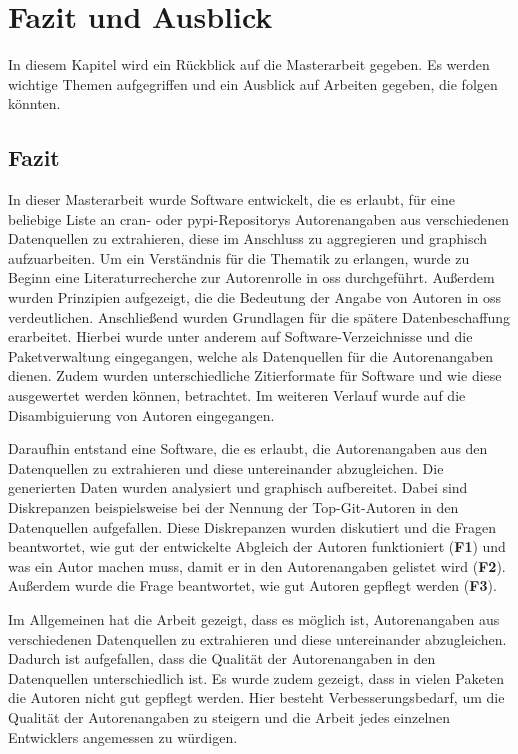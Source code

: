 \chapter{Fazit und Ausblick}
\label{cap:fazit_ausblick}
In diesem Kapitel wird ein Rückblick auf die Masterarbeit gegeben. Es werden wichtige Themen aufgegriffen und ein Ausblick auf Arbeiten gegeben, die folgen könnten.

\section{Fazit}
\label{sec:fazit}
In dieser Masterarbeit wurde Software entwickelt, die es erlaubt, für eine beliebige Liste an \gls{cran}- oder \gls{pypi}-Repositorys Autorenangaben aus verschiedenen Datenquellen zu extrahieren, diese im Anschluss zu aggregieren und graphisch aufzuarbeiten.
Um ein Verständnis für die Thematik zu erlangen, wurde zu Beginn eine Literaturrecherche zur Autorenrolle in \gls{oss} durchgeführt.
Außerdem wurden Prinzipien aufgezeigt, die die Bedeutung der Angabe von Autoren in \gls{oss} verdeutlichen.
Anschließend wurden Grundlagen für die spätere Datenbeschaffung erarbeitet.
Hierbei wurde unter anderem auf Software-Verzeichnisse und die Paketverwaltung eingegangen, welche als Datenquellen für die Autorenangaben dienen.
Zudem wurden unterschiedliche Zitierformate für Software und wie diese ausgewertet werden können, betrachtet.
Im weiteren Verlauf wurde auf die Disambiguierung von Autoren eingegangen.

Daraufhin entstand eine Software, die es erlaubt, die Autorenangaben aus den Datenquellen zu extrahieren und diese untereinander abzugleichen.
Die generierten Daten wurden analysiert und graphisch aufbereitet.
Dabei sind Diskrepanzen beispielsweise bei der Nennung der Top-Git-Autoren in den Datenquellen aufgefallen.
Diese Diskrepanzen wurden diskutiert und die Fragen beantwortet, wie gut der entwickelte Abgleich der Autoren funktioniert (\textbf{F1}) und was ein Autor machen muss, damit er in den Autorenangaben gelistet wird (\textbf{F2}).
Außerdem wurde die Frage beantwortet, wie gut Autoren gepflegt werden (\textbf{F3}).

Im Allgemeinen hat die Arbeit gezeigt, dass es möglich ist, Autorenangaben aus verschiedenen Datenquellen zu extrahieren und diese untereinander abzugleichen.
Dadurch ist aufgefallen, dass die Qualität der Autorenangaben in den Datenquellen unterschiedlich ist.
Es wurde zudem gezeigt, dass in vielen Paketen die Autoren nicht gut gepflegt werden.
Hier besteht Verbesserungsbedarf, um die Qualität der Autorenangaben zu steigern und die Arbeit jedes einzelnen Entwicklers angemessen zu würdigen.

